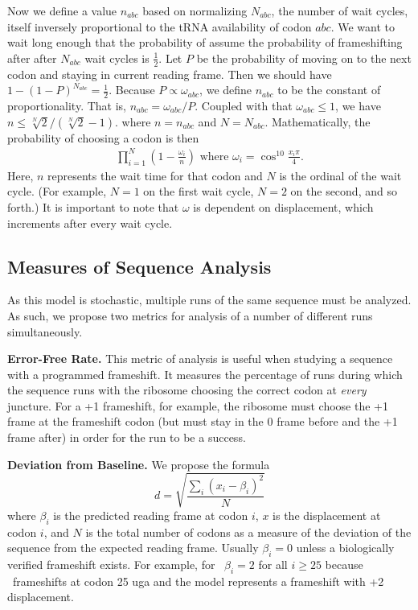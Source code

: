 \documentclass[12pt, draft]{article}
\numberwithin{equation}{section}
\begin{document}
Now we define a value $n_{abc}$ based on normalizing $N_{abc}$, the
number of wait cycles, itself inversely proportional to the
tRNA availability of codon $abc$.
We want to wait long enough that the probability of assume the probability of frameshifting after
after $N_{abc}$ wait cycles is $\frac{1}{2}$.  Let $P$ be the
probability of moving on to the next codon and staying in current reading
frame.  Then we should have $1-\left(1-P\right)^{N_{abc}} =
\frac{1}{2}$.  Because $P \propto \omega_{abc}$, we define $n_{abc}$ to be the constant of
proportionality. That is, $n_{abc} = \omega_{abc} / P$.  Coupled
with that $\omega_{abc} \le 1$, we have $n \le \sqrt[N]{2}/(\sqrt[N]{2} - 1).$
where $n = n_{abc}$ and $N = N_{abc}$. Mathematically, the probability of choosing a codon is then
\begin{align}
  \prod_{i=1}^N \left(1-\frac{\omega_i}{n}\right) \text{ where } \omega_i = \cos^{10}{\frac{x_i\pi}{4}}.
\end{align}
Here, $n$ represents the wait time for that codon and $N$ is the ordinal of the wait cycle. (For example,
$N=1$ on the first wait cycle, $N=2$ on the second, and so forth.)
It is important to note that $\omega$ is dependent on displacement, 
which increments after every wait cycle.


\subsection{Measures of Sequence Analysis}

As this model is stochastic, multiple runs of the same sequence must be analyzed.
As such, we propose two metrics for analysis of a number of different runs 
simultaneously. 

{\textbf{Error-Free Rate.}}  
This metric of analysis is useful when studying a 
sequence with a programmed frameshift.  It measures the percentage of runs 
during which the sequence runs with the ribosome choosing the correct codon
at \emph{every} juncture.  For a +1 frameshift, for example, the ribosome must
choose the +1 frame at the frameshift codon (but must stay in the 0 frame before
and the +1 frame after) in order for the run to be a success.

{\textbf{Deviation from Baseline.}}
We propose the formula
\begin{equation}
    \label{eqn:lbd}
    d = \sqrt{\frac{\sum_i \left(x_i - \beta_i\right)^2}{N}}
\end{equation}
where $\beta_i$ is the predicted reading frame at codon $i$, $x$ is the displacement at codon $i$,
and $N$ is the total number of codons as a measure of the deviation of the sequence
from the expected reading frame.  Usually $\beta_i = 0$ unless a biologically verified frameshift exists. For example, for \prfB\ $\beta_i = 2$ for all $i \geq 25$ because \prfB\ frameshifts at codon 25 uga
and the model represents a frameshift with +2 displacement.
\end{document}
